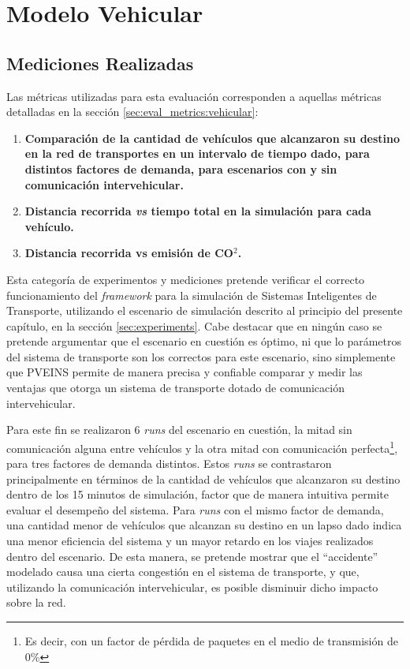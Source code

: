 \section{Modelo Vehicular}\label{sec:results:vehicular}

\subsection{Mediciones Realizadas}

Las métricas utilizadas para esta evaluación corresponden a aquellas métricas detalladas en la sección \ref{sec:eval_metrics:vehicular}:
\begin{enumerate}
    \item \textbf{Comparación de la cantidad de vehículos que alcanzaron su destino en la red de transportes en un intervalo de tiempo dado, para distintos factores de demanda, para escenarios con y sin comunicación intervehicular.}
    \item \textbf{Distancia recorrida \emph{vs} tiempo total en la simulación para cada vehículo.}
    \item \textbf{Distancia recorrida vs emisión de CO$^{2}$.}
\end{enumerate}

Esta categoría de experimentos y mediciones pretende verificar el correcto funcionamiento del \emph{framework} para la simulación de Sistemas Inteligentes de Transporte, utilizando el escenario de simulación descrito al principio del presente capítulo, en la sección \ref{sec:experiments}. Cabe destacar que en ningún caso se pretende argumentar que el escenario en cuestión es óptimo, ni que lo parámetros del sistema de transporte son los correctos para este escenario, sino simplemente que PVEINS permite de manera precisa y confiable comparar y medir las ventajas que otorga un sistema de transporte dotado de comunicación intervehicular.

Para este fin se realizaron 6 \emph{runs} del escenario en cuestión, la mitad sin comunicación alguna entre vehículos y la otra mitad con comunicación perfecta\footnote{Es decir, con un factor de pérdida de paquetes en el medio de transmisión de 0\%}, para tres factores de demanda distintos. Estos \emph{runs} se contrastaron principalmente en términos de la cantidad de vehículos que alcanzaron su destino dentro de los 15 minutos de simulación, factor que de manera intuitiva permite evaluar el desempeño del sistema. Para \emph{runs} con el mismo factor de demanda, una cantidad menor de vehículos que alcanzan su destino en un lapso dado indica una menor eficiencia del sistema y un mayor retardo en los viajes realizados dentro del escenario. De esta manera, se pretende mostrar que el ``accidente'' modelado causa una cierta congestión en el sistema de transporte, y que, utilizando la comunicación intervehicular, es posible disminuir dicho impacto sobre la red. 

